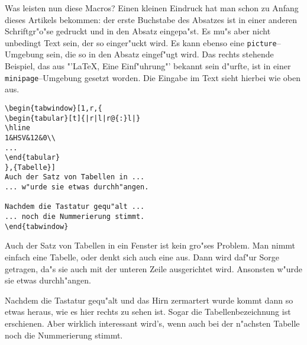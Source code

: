 \begin{figwindow}
Was leisten nun diese Macros? Einen kleinen Eindruck hat man schon
zu Anfang dieses Artikels bekommen: der erste Buchstabe des Absatzes
ist in einer anderen Schriftgr"o"se gedruckt und in den Absatz eingepa"st.
Es mu"s aber nicht unbedingt Text sein, der so einger"uckt wird. Es kann
ebenso eine \verb?picture?--Umgebung sein, die so in den Absatz eingef"ugt
wird. Das rechts stehende Beispiel, das aus "'\LaTeX , Eine Einf"uhrung"'
bekannt sein d"urfte, ist in einer \verb?minipage?--Umgebung gesetzt
worden. Die Eingabe im Text sieht hierbei wie oben aus.
\end{figwindow}

\begin{verbatim}
\begin{tabwindow}[1,r,{
\begin{tabular}[t]{|r|l|r@{:}l|}
\hline
1&HSV&12&0\\
...
\end{tabular}
},{Tabelle}]
Auch der Satz von Tabellen in ...
... w"urde sie etwas durchh"angen.

Nachdem die Tastatur gequ"alt ...
... noch die Nummerierung stimmt.
\end{tabwindow}
\end{verbatim}

Auch der Satz von Tabellen in ein Fenster ist kein gro"ses Problem.
Man nimmt einfach eine Tabelle, oder denkt sich auch eine aus.
Dann wird daf"ur Sorge getragen, da"s sie auch mit der unteren
Zeile ausgerichtet wird. Ansonsten w"urde sie etwas durchh"angen.

Nachdem die Tastatur gequ"alt und das Hirn zermartert wurde kommt
dann so etwas heraus, wie es hier rechts zu sehen ist. Sogar die
Tabellenbezeichnung ist erschienen. Aber wirklich interessant wird's,
wenn auch bei der n"achsten Tabelle noch die Nummerierung stimmt.
\end{tabwindow}

